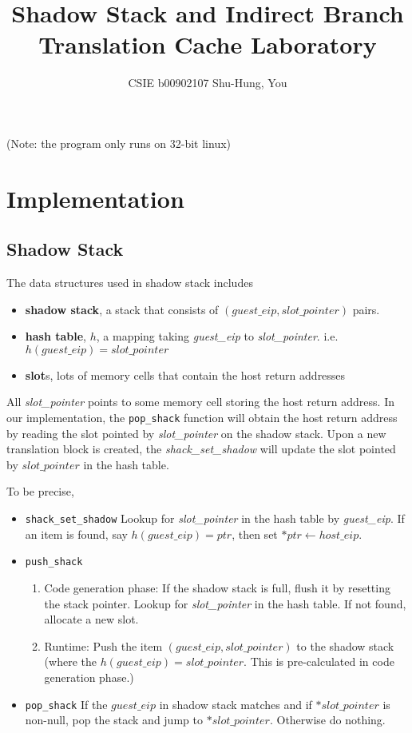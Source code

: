 \documentclass{article}
\begin{document}
\author{CSIE b00902107 Shu-Hung, You}
\title{Shadow Stack and Indirect Branch Translation Cache Laboratory}
\date{}
\maketitle
(Note: the program only runs on 32-bit linux)
\section{Implementation}
\subsection{Shadow Stack}
The data structures used in shadow stack includes
\begin{itemize}
\item \textbf{shadow stack}, a stack that consists of $(guest\_eip,slot\_pointer)$ pairs.
\item \textbf{hash table}, $h$, a mapping taking \textit{guest\_eip} to \textit{slot\_pointer}. i.e. $h(guest\_eip)=slot\_pointer$
\item \textbf{slot}s, lots of memory cells that contain the host return addresses
\end{itemize}
All \textit{slot\_pointer} points to some memory cell storing the host return address. In our implementation, the \texttt{pop\_shack} function will obtain the host return address by reading the slot pointed by \textit{slot\_pointer} on the shadow stack. Upon a new translation block is created, the \textit{shack\_set\_shadow} will update the slot pointed by $slot\_pointer$ in the hash table.

To be precise,
\begin{itemize}
\item \texttt{shack\_set\_shadow} Lookup for \textit{slot\_pointer} in the hash table by \textit{guest\_eip}. If an item is found, say $h(guest\_eip)=ptr$, then set $*ptr \gets host\_eip$.
\item \texttt{push\_shack}
\begin{enumerate}
\item Code generation phase: If the shadow stack is full, flush it by resetting the stack pointer. Lookup for \textit{slot\_pointer} in the hash table. If not found, allocate a new slot.
\item Runtime: Push the item $(guest\_eip,slot\_pointer)$ to the shadow stack (where the $h(guest\_eip)=slot\_pointer$. This is pre-calculated in code generation phase.)
\end{enumerate}
\item \texttt{pop\_shack} If the $guest\_eip$ in shadow stack matches and if $*slot\_pointer$ is non-null, pop the stack and jump to $*slot\_pointer$. Otherwise do nothing.
\end{itemize}
\end{document}
